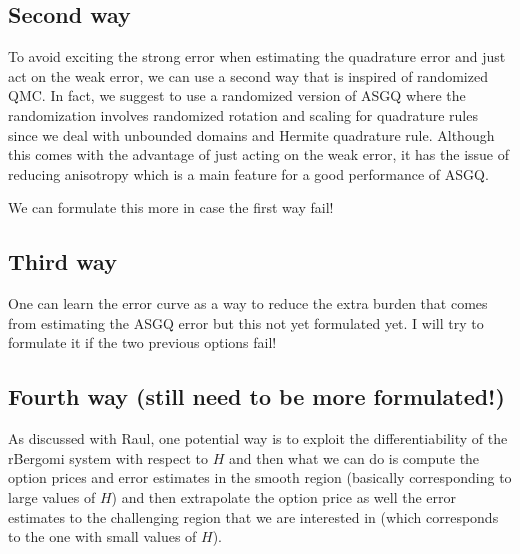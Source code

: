 \subsection{Second way}
To avoid exciting the strong error when estimating the quadrature error and just act on the weak error, we can use a second way that is inspired of randomized QMC. In fact, we suggest to use a randomized version of ASGQ where the randomization involves randomized rotation and scaling for quadrature rules since we deal with unbounded domains and Hermite quadrature rule. Although this comes with the advantage of just acting on the weak error, it has the issue of reducing anisotropy which is a main feature for a good performance of ASGQ.

We can formulate this more in case the first way fail!

\subsection{Third way}
One can learn the error curve as a way to reduce the extra burden that comes
from estimating the ASGQ error but this not yet formulated yet. I will try to formulate it if the two previous options fail!

\subsection{Fourth way (still need to be more formulated!)}
As discussed with Raul, one potential way is to exploit the differentiability of the rBergomi system with respect to $H$ and then what we can do is compute the option prices and error estimates in the smooth region (basically corresponding to large values of $H$) and then extrapolate the option price as well the error estimates to the challenging region that we are interested in (which corresponds to the one with small values of $H$). 